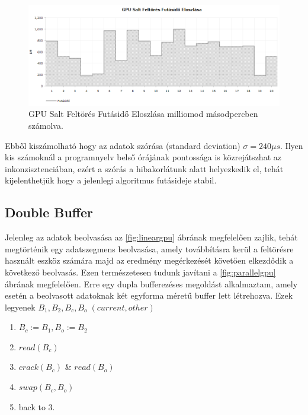 \begin{figure}[H]
    \centering
    \includegraphics[width=\textwidth]{images/charts/performance-1-distribution.png}
    \caption{GPU Salt Feltörés Futásidő Eloszlása milliomod másodpercben számolva.}
\end{figure}


Ebből kiszámolható hogy az adatok szórása (standard deviation) $\sigma = 240\mu s$. Ilyen kis számoknál a programnyelv belső órájának pontossága is közrejátszhat az inkonzisztenciában, ezért a szórás a hibakorlátunk alatt helyezkedik el, tehát kijelenthetjük hogy a jelenlegi algoritmus futásideje stabil.



\subsection{Double Buffer}



Jelenleg az adatok beolvasása az \ref{fig:lineargpu} ábrának megfelelően zajlik, tehát megtörténik egy adatszegmens beolvasása, amely továbbításra kerül a feltörésre használt eszköz számára majd az eredmény megérkezését követően elkezdődik a következő beolvasás. Ezen természetesen tudunk javítani a  \ref{fig:parallelgpu} ábrának megfelelően. Erre egy dupla bufferezéses megoldást alkalmaztam, amely esetén a beolvasott adatoknak két egyforma méretű buffer lett létrehozva. Ezek legyenek $B_1, B_2, B_c, B_o \; (current, other)$
%
\begin{enumerate}
    \itemsep-0.5em
    \item $ B_c := B_1, B_o := B_2 $
    \item $ read(B_c) $
    \item $ crack(B_c) $ \& $ read(B_o) $
    \item $ swap(B_c, B_o) $
    \item back to 3.
\end{enumerate}

